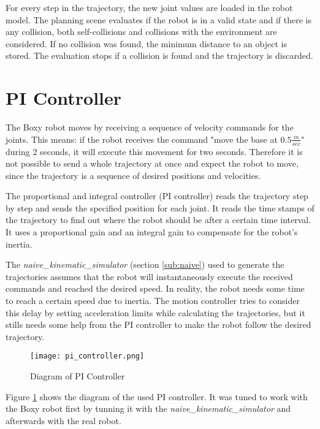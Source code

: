 For every step in the trajectory, the new joint values are loaded in the robot model. The planning scene evaluates if the robot is in a valid state and if there is any collision, both self-collisions and collisions with the environment are considered. If no collision was found, the minimum distance to an object is stored. The evaluation stops if a collision is found and the trajectory is discarded.

\section{PI Controller}
\label{sec:pi_controller}

The Boxy robot moves by receiving a sequence of velocity commands for the joints. This means: if the robot receives the command "move the base at $0.5\frac{m}{sec}$" during 2 seconds, it will execute this movement for two seconds. Therefore it is not possible to send a whole trajectory at once and expect the robot to move, since the trajectory is a sequence of desired positions and velocities.

The proportional and integral controller (PI controller) reads the trajectory step by step and sends the specified position for each joint. It reads the time stamps of the trajectory to find out where the robot should be after a certain time interval. It uses a proportional gain and an integral gain to compensate for the robot's inertia. 

The \textit{naive\_kinematic\_simulator} (section \ref{sub:naive}) used to generate the trajectories assumes that the robot will instantaneously execute the received commands and reached the desired speed. In reality, the robot needs some time to reach a certain speed due to inertia. The motion controller tries to consider this delay by setting acceleration limits while calculating the trajectories, but it stills needs some help from the PI controller to make the robot follow the desired trajectory.

\begin{figure}[H]
	\centering
	\texttt{[image: pi\_controller.png]}
	\vspace{-10pt}
	\caption{Diagram of PI Controller}
	\vspace{-15pt}
	\label{fig:pi}
\end{figure}

Figure \ref{fig:pi} shows the diagram of the used PI controller. It was tuned to work with the Boxy robot first by tunning it with the \textit{naive\_kinematic\_simulator} and afterwards with the real robot.

